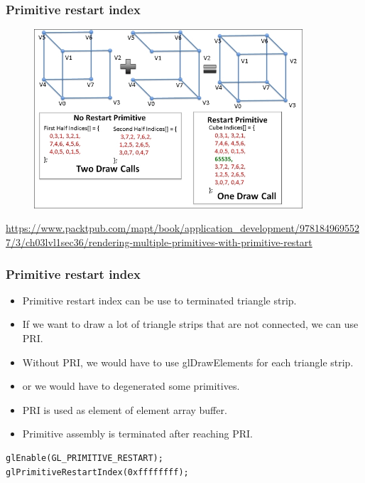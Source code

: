 \begin{frame}[fragile]
\frametitle{Primitive restart index}
	\begin{figure}[h]
	\includegraphics[width=10cm,keepaspectratio]{pics/pri.jpg}
	\end{figure}
\url{https://www.packtpub.com/mapt/book/application_development/9781849695527/3/ch03lvl1sec36/rendering-multiple-primitives-with-primitive-restart}
\end{frame}


\begin{frame}[fragile]
\frametitle{Primitive restart index}
	\begin{itemize}
    \item Primitive restart index can be use to terminated triangle strip.
    \item If we want to draw a lot of triangle strips that are not connected, we can use PRI.
    \item Without PRI, we would have to use glDrawElements for each triangle strip.
    \item or we would have to degenerated some primitives.
    \item PRI is used as element of element array buffer.
    \item Primitive assembly is terminated after reaching PRI.
	\end{itemize}
\begin{verbatim}
glEnable(GL_PRIMITIVE_RESTART);
glPrimitiveRestartIndex(0xffffffff);
\end{verbatim}
\end{frame}


